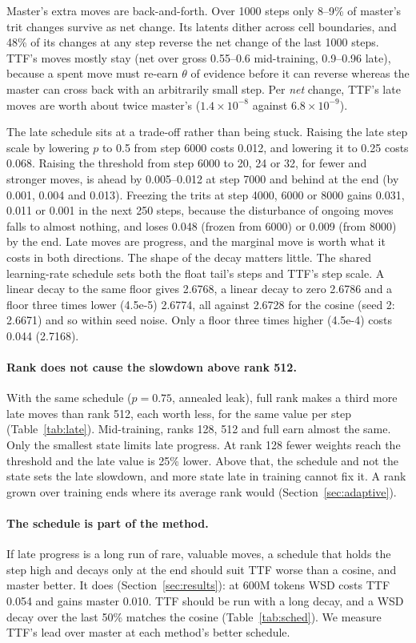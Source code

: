 \documentclass[10pt,twocolumn]{article}
\begin{document}
Master's extra moves are back-and-forth. Over 1000 steps only 8--9\% of master's trit changes survive as net change.
Its latents dither across cell boundaries, and 48\% of its changes at any step reverse the net change of the last 1000
steps.
TTF's moves mostly stay (net over gross 0.55--0.6 mid-training, 0.9--0.96 late), because a spent move must re-earn
$\theta$ of evidence before it can reverse whereas the master can cross back with an arbitrarily small step. Per \emph{net} change, TTF's late moves are worth about twice master's
($1.4\times10^{-8}$ against $6.8\times10^{-9}$).

The late schedule sits at a trade-off rather than being stuck. Raising the late step scale by lowering $p$ to 0.5 from
step 6000 costs 0.012, and lowering it to 0.25 costs 0.068. Raising the threshold from step 6000 to 20, 24 or 32, for
fewer and stronger moves, is ahead by 0.005--0.012 at step 7000 and behind at the end (by 0.001, 0.004 and 0.013).
Freezing the trits at step 4000, 6000 or 8000 gains 0.031, 0.011 or 0.001 in the next 250 steps, because the disturbance
of ongoing moves falls to almost nothing, and loses 0.048 (frozen from 6000) or 0.009 (from 8000) by the end. Late moves
are progress, and the marginal move is worth what it costs in both directions. The shape of the decay matters little.
The shared learning-rate schedule sets both the float tail's steps and TTF's step scale. A linear decay to the same
floor gives 2.6768, a linear decay to zero 2.6786 and a floor three times lower (4.5e-5) 2.6774, all against 2.6728 for
the cosine (seed 2: 2.6671) and so within seed noise. Only a floor three times higher (4.5e-4) costs 0.044 (2.7168).

\paragraph{Rank does not cause the slowdown above rank 512.} With the same schedule ($p=0.75$, annealed leak), full
rank makes a third more late moves than rank 512, each worth less, for the same value per step (Table~\ref{tab:late}).
Mid-training, ranks 128, 512 and full earn almost the same. Only the smallest state limits late progress. At rank 128
fewer weights reach the threshold and the late value is 25\% lower. Above that, the schedule and not the state sets the
late slowdown, and more state late in training cannot fix it. A rank grown over training ends where its average rank
would (Section~\ref{sec:adaptive}).

\paragraph{The schedule is part of the method.} If late progress is a long run of rare, valuable moves, a schedule that
holds the step high and decays only at the end should suit TTF worse than a cosine, and master better. It does
(Section~\ref{sec:results}): at 600M tokens WSD costs TTF 0.054 and gains master 0.010. TTF should be run with a long
decay, and a WSD decay over the last 50\% matches the cosine (Table~\ref{tab:sched}). We measure TTF's lead over master
at each method's better schedule.
\end{document}
